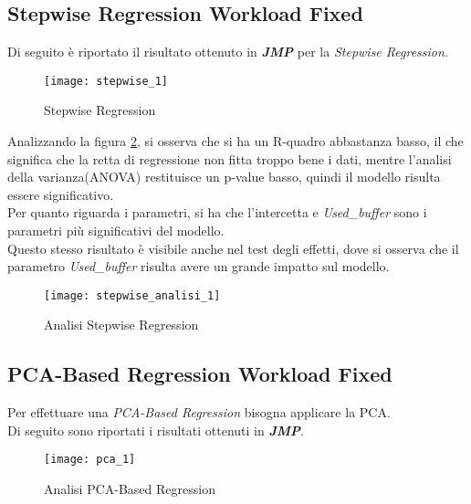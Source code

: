 \clearpage

\subsection{Stepwise Regression Workload Fixed}

Di seguito è riportato il risultato ottenuto in \textbf{\textit{JMP}} per
la \textit{Stepwise Regression}.\\

\begin{figure}[!htbp]
  \centering
  \texttt{[image: stepwise\_1]}
  \caption{Stepwise Regression}
  \label{stepwise_1}
\end{figure}
\clearpage
Analizzando la figura \ref{stepwise_analisi_1}, si osserva che si ha un R-quadro
abbastanza basso, il che significa che la retta di regressione non fitta troppo
bene i dati, mentre l'analisi della varianza(ANOVA) restituisce un p-value basso,
quindi il modello risulta essere significativo.\\
Per quanto riguarda i parametri, si ha che l'intercetta e \textit{Used\_buffer}
sono i parametri più significativi del modello.\\
Questo stesso risultato è visibile anche nel test degli effetti, dove si osserva
che il parametro \textit{Used\_buffer} risulta avere un grande impatto sul modello.\\
\begin{figure}[!htbp]
  \centering
  \texttt{[image: stepwise\_analisi\_1]}
  \caption{Analisi Stepwise Regression}
  \label{stepwise_analisi_1}
\end{figure}

\clearpage

\subsection{PCA-Based Regression Workload Fixed}

Per effettuare una \textit{PCA-Based Regression} bisogna applicare la PCA.\\
Di seguito sono riportati i risultati ottenuti in \textbf{\textit{JMP}}.\\

\begin{figure}[!htbp]
  \centering
  \texttt{[image: pca\_1]}
  \caption{Analisi PCA-Based Regression}
  \label{pca_1}
\end{figure}

